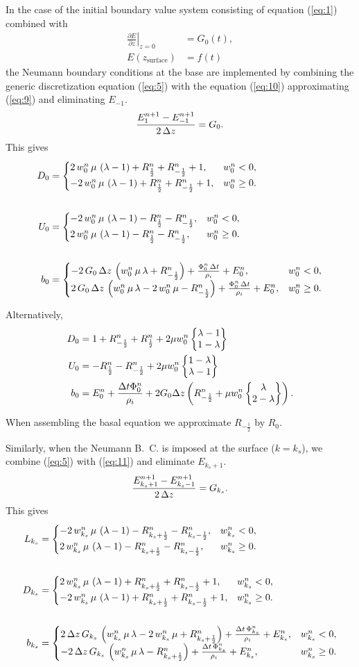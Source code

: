 \documentclass{article}
\newcommand{\wcase}[3]{\begin{cases} #1, & w^{n}_{#3} < 0,\\#2, & w^{n}_{#3} \ge 0.\end{cases}}
\newcommand{\wcaseeq}[4]{#1 &= \wcase{#2}{#3}{#4}}
\begin{document}
In the case of the initial boundary value system consisting of
equation (\ref{eq:1}) combined with
\begin{align}
  \label{eq:9}
  \left.\frac{\partial E}{\partial z}\right|_{z = 0} &= G_{0}(t),\\
  E(z_{\text{surface}}) &= f(t)
\end{align}
the Neumann boundary conditions at the base are implemented by
combining the generic discretization equation (\ref{eq:5}) with the
equation (\ref{eq:10}) approximating (\ref{eq:9}) and eliminating
$E_{-1}$.
\begin{equation}
  \label{eq:10}
  \frac{E^{n+1}_{1}-E^{n+1}_{-1}}{2\,\Delta z}=G_{0}.
\end{equation}
This gives
\begin{align}
  \wcaseeq{D_{0}}{\Dmb}{\Dpb}{0}\\
  \notag\\
  \wcaseeq{U_{0}}{\Umb}{\Upb}{0}\\
  \notag\\
  \wcaseeq{b_{0}}{\Bmb}{\Bpb}{0}
\end{align}

\renewcommand{\Rp}{R^{n}_{\frac{1}{2}}}
\renewcommand{\Rm}{R^{n}_{-\frac{1}{2}}}
\renewcommand{\W}{w^{n}_{0}}

\newcommand{\rhs}[1]{E^{n}_{#1} + \frac{\Delta t \Phi^{n}_{#1}}{\rho_{i}}}

Alternatively,
\begin{align}
  D_{0} &= 1 + \Rm + \Rp + 2\mu\W \wstack{\lambda - 1}{1 - \lambda}\\
  U_{0} &= -\Rp -\Rm + 2\mu\W \wstack{1 - \lambda}{\lambda - 1}\\
  b_{0} &= \rhs{0} + 2G_{0}\Delta z \left( \Rm + \mu\W\wstack{\lambda}{2 - \lambda} \right).
\end{align}

When assembling the basal equation we approximate $R_{-\frac{1}{2}}$ by $R_{0}$.

\newcommand{\ks}{k_{s}}

Similarly, when the Neumann B.~C. is imposed at the surface ($k =
\ks$), we combine (\ref{eq:5}) with (\ref{eq:11}) and eliminate $E_{\ks+1}$.
\begin{equation}
  \label{eq:11}
  \frac{E^{n+1}_{k_{s}+1}-E^{n+1}_{k_{s}-1}}{2\,\Delta z}=G_{k_{s}}.
\end{equation}
This gives
\begin{align}
  \wcaseeq{L_{\ks}}{\Lms}{\Lps}{\ks}\\
  \notag\\
  \wcaseeq{D_{\ks}}{\Dms}{\Dps}{\ks}\\
  \notag\\
  \wcaseeq{b_{\ks}}{\Bms}{\Bps}{\ks}
\end{align}
\end{document}
